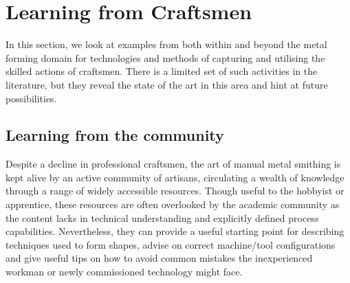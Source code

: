 





\newpage
\section{Learning from Craftsmen} \label{sec:Learning}


In this section, we look at examples from both within and beyond the metal forming domain for technologies and methods of capturing and utilising the skilled actions of craftsmen. There is a limited set of such activities in the literature, but they reveal the state of the art in this area and hint at future possibilities. 

\subsection{Learning from the community \label{sec:LfC}}
Despite a decline in professional craftsmen, the art of manual metal smithing is kept alive by an active community of artisans, circulating a wealth of knowledge through a range of widely accessible resources. Though useful to the hobbyist or apprentice, these resources are often overlooked by the academic community as the content lacks in technical understanding and explicitly defined process capabilities. Nevertheless, they can provide a useful starting point for describing techniques used to form shapes, advise on correct machine/tool configurations and give useful tips on how to avoid common mistakes the inexperienced workman or newly commissioned technology might face.

